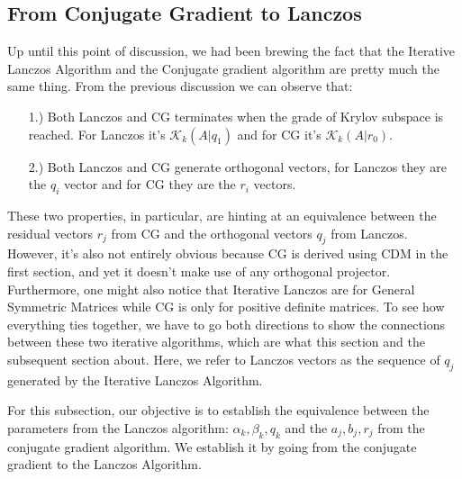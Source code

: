 \documentclass[]{article}
\theoremstyle{definition}
\begin{document}
    \subsection{From Conjugate Gradient to Lanczos}
        Up until this point of discussion, we had been brewing the fact that the Iterative Lanczos Algorithm and the Conjugate gradient algorithm are pretty much the same thing. From the previous discussion we can observe that: 
        \begin{enumerate}
            \item [1.)] Both Lanczos and CG terminates when the grade of Krylov subspace is reached. For Lanczos it's $\mathcal K_k(A|q_1)$ and for CG it's $\mathcal K_k(A|r_0)$.
            \item [2.)] Both Lanczos and CG generate orthogonal vectors, for Lanczos they are the $q_i$ vector and for CG they are the $r_i$ vectors. 
        \end{enumerate}
        These two properties, in particular, are hinting at an equivalence between the residual vectors $r_j$ from CG and the orthogonal vectors $q_j$ from Lanczos. However, it's also not entirely obvious because CG is derived using CDM in the first section, and yet it doesn't make use of any orthogonal projector. Furthermore, one might also notice that Iterative Lanczos are for General Symmetric Matrices while CG is only for positive definite matrices. To see how everything ties together, we have to go both directions to show the connections between these two iterative algorithms, which are what this section and the subsequent section about. Here, we refer to Lanczos vectors as the sequence of $q_j$ generated by the Iterative Lanczos Algorithm. 
        \par
        For this subsection, our objective is to establish the equivalence between the parameters from the Lanczos algorithm: $\alpha_k, \beta_k, q_k$ and the $a_j, b_j, r_j$ from the conjugate gradient algorithm. We establish it by going from the conjugate gradient to the Lanczos Algorithm. 
\end{document}
